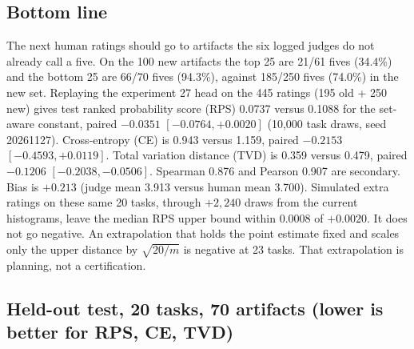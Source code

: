 
\subsection*{Bottom line}
The next human ratings should go to artifacts the six logged judges do not already call a five.
On the 100 new artifacts the top 25 are 21/61 fives (34.4\%) and the bottom 25 are 66/70 fives (94.3\%), against 185/250 fives (74.0\%) in the new set.
Replaying the experiment 27 head on the 445 ratings (195 old + 250 new) gives test ranked probability score (RPS) 0.0737 versus 0.1088 for the set-aware constant, paired $-0.0351$ $[-0.0764,+0.0020]$ (10,000 task draws, seed 20261127).
Cross-entropy (CE) is 0.943 versus 1.159, paired $-0.2153$ $[-0.4593,+0.0119]$.
Total variation distance (TVD) is 0.359 versus 0.479, paired $-0.1206$ $[-0.2038,-0.0506]$.
Spearman 0.876 and Pearson 0.907 are secondary.
Bias is $+0.213$ (judge mean 3.913 versus human mean 3.700).
Simulated extra ratings on these same 20 tasks, through $+2{,}240$ draws from the current histograms, leave the median RPS upper bound within 0.0008 of $+0.0020$.
It does not go negative.
An extrapolation that holds the point estimate fixed and scales only the upper distance by $\sqrt{20/m}$ is negative at 23 tasks.
That extrapolation is planning, not a certification.

\subsection*{Held-out test, 20 tasks, 70 artifacts (lower is better for RPS, CE, TVD)}
\begin{center}\scriptsize\setlength{\tabcolsep}{3pt}
\end{center}

